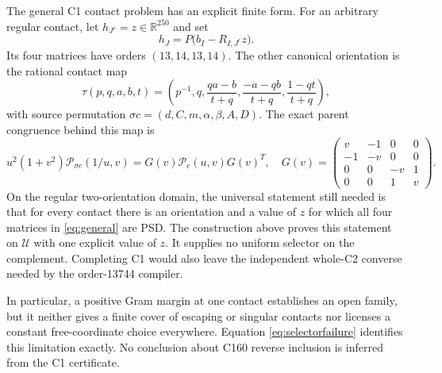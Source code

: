 \documentclass[11pt]{article}
\newcommand{\R}{\mathbb R}
\begin{document}
The general C1 contact problem has an explicit finite form.  For an
arbitrary regular contact, let $h_{J^c}=z\in\R^{250}$ and set
\begin{equation}
 h_J=P\bigl(b_I-R_{I,J^c}z\bigr).
 \label{eq:general}
\end{equation}
Its four matrices have orders $(13,14,13,14)$.  The other canonical
orientation is the rational contact map
\begin{equation}
 \tau(p,q,a,b,t)=\left(p^{-1},q,
       \frac{qa-b}{t+q},\frac{-a-qb}{t+q},\frac{1-qt}{t+q}\right),
 \label{eq:reflection}
\end{equation}
with source permutation
$\sigma c=(d,C,m,\alpha,\beta,A,D)$.
The exact parent congruence behind this map is
\[
 u^2(1+v^2)\mathcal P_{\sigma c}(1/u,v)
     =G(v)\mathcal P_c(u,v)G(v)^T,
\quad
G(v)=\begin{pmatrix}v&-1&0&0\\-1&-v&0&0\\
0&0&-v&1\\0&0&1&v\end{pmatrix}.
\]
On the regular two-orientation domain, the universal statement still
needed is that for every contact there is an orientation and a value
of $z$ for which all four matrices in \eqref{eq:general} are PSD.
The construction above proves this statement on $\mathcal U$ with one
explicit value of $z$.  It supplies no uniform selector on the
complement.  Completing C1 would also leave the independent whole-C2
converse needed by the order-13744 compiler.

In particular, a positive Gram margin at one contact establishes an
open family, but it neither gives a finite cover of escaping or singular
contacts nor licenses a constant free-coordinate choice everywhere.
Equation \eqref{eq:selectorfailure} identifies this limitation exactly.
No conclusion about C160 reverse inclusion is inferred from the C1
certificate.
\end{document}
